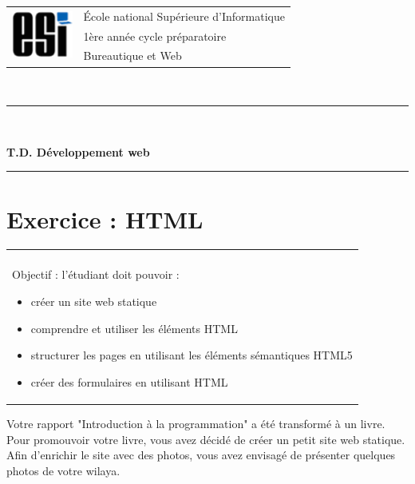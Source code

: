 \documentclass[11pt, a4paper]{article}
\begin{document}

\noindent
\begin{tabular}{ll}
\multirow{3}{*}{\includegraphics[width=2cm]{../esi-logo.png}} & \'Ecole national Supérieure d'Informatique\\
& 1ère année cycle préparatoire\\
& Bureautique et Web
\end{tabular}\\[.25cm]
\noindent\rule{\textwidth}{1pt}\\%
\begin{center}
{\LARGE \textbf{T.D. Développement web}}
\end{center}
\noindent\rule{\textwidth}{1pt}

\section*{Exercice : HTML}

\vspace{-12pt}
\begin{tabular}{|p{\textwidth}|}
	\hline\\
	Objectif : l'étudiant doit pouvoir : 
	\begin{itemize}
		\item créer un site web statique 
		\item comprendre et utiliser les éléments HTML
		\item structurer les pages en utilisant les éléments sémantiques HTML5
		\item créer des formulaires en utilisant HTML
	\end{itemize}\\
	\hline
\end{tabular}

Votre rapport "Introduction à la programmation" a été transformé à un livre. 
Pour promouvoir votre livre, vous avez décidé de créer un petit site web statique. 
Afin d'enrichir le site avec des photos, vous avez envisagé de présenter quelques photos de votre wilaya.
\end{document}
